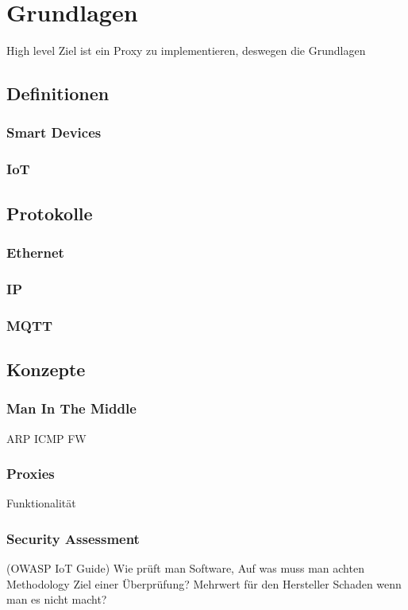 \chapter{Grundlagen}
High level Ziel ist ein Proxy zu implementieren, deswegen die Grundlagen

\section{Definitionen}
    \subsection{Smart Devices}
    \subsection{IoT}

\section{Protokolle}
    \subsection{Ethernet}
    \subsection{IP}
    \subsection{MQTT}

\section{Konzepte}
    \subsection{Man In The Middle}
    ARP
    ICMP
    FW
    \subsection{Proxies}
        Funktionalität
    \subsection{Security Assessment}
        (OWASP IoT Guide) 
        Wie prüft man Software, Auf was muss man achten Methodology %
        Ziel einer Überprüfung?
        Mehrwert für den Hersteller
        Schaden wenn man es nicht macht?
